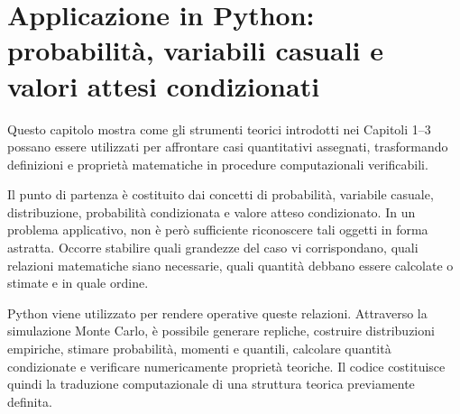 




\chapter{Applicazione in Python: probabilit\`{a}, variabili
casuali e valori attesi condizionati}

Questo capitolo mostra come gli strumenti teorici introdotti nei Capitoli
1--3 possano essere utilizzati per affrontare casi quantitativi assegnati,
trasformando definizioni e propriet\`{a} matematiche in procedure
computazionali verificabili.

Il punto di partenza \`{e} costituito dai concetti di probabilit\`{a},
variabile casuale, distribuzione, probabilit\`{a} condizionata e valore atteso
condizionato. In un problema applicativo, non \`{e} per\`{o} sufficiente
riconoscere tali oggetti in forma astratta. Occorre stabilire quali grandezze
del caso vi corrispondano, quali relazioni matematiche siano necessarie, quali
quantit\`{a} debbano essere calcolate o stimate e in quale ordine.

Python viene utilizzato per rendere operative queste relazioni. Attraverso la
simulazione Monte Carlo, \`{e} possibile generare repliche, costruire
distribuzioni empiriche, stimare probabilit\`{a}, momenti e quantili, calcolare
quantit\`{a} condizionate e verificare numericamente propriet\`{a} teoriche.
Il codice costituisce quindi la traduzione computazionale di una struttura
teorica previamente definita.

